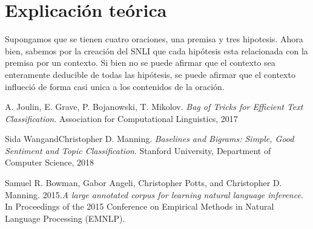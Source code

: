 \documentclass{article}
\begin{document}
	\section*{Explicación teórica}
	Supongamos que se tienen cuatro oraciones, una premisa y tres hipotesis. Ahora bien, sabemos por la creación del SNLI\cite{snli} que cada hipótesis esta relacionada con la premisa por un contexto. Si bien no se puede afirmar que el contexto sea enteramente deducible de todas las hipótesis, se puede afirmar que el contexto influeció de forma casi unica a los contenidos de la oración.
	
	\newpage
	\begin{thebibliography}{9}
		A. Joulin, E. Grave, P. Bojanowski, T. Mikolov. \textit{Bag of Tricks for Efficient Text Classification}. Association for Computational Linguistics, 2017
		
		Sida WangandChristopher D. Manning. \textit{Baselines and Bigrams: Simple, Good Sentiment and Topic Classification}. Stanford University, Department of Computer Science, 2018
		
		Samuel R. Bowman, Gabor Angeli, Christopher Potts, and Christopher D. Manning. 2015.\textit{A large annotated corpus for learning natural language inference}. In Proceedings of the 2015 Conference on Empirical Methods in Natural Language Processing (EMNLP). 
	\end{thebibliography}
\end{document}
